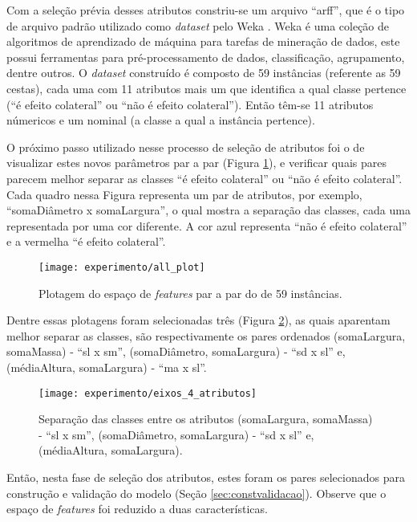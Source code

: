 Com a seleção prévia desses atributos constriu-se um arquivo ``arff'', que é o tipo de arquivo padrão utilizado como \textit{dataset} pelo Weka \cite{Hall:2009}. Weka é uma coleção de algoritmos de aprendizado de máquina para tarefas de mineração de dados, este possui ferramentas para pré-processamento de dados, classificação, agrupamento, dentre outros. O \textit{dataset} construído é composto de 59 instâncias (referente as 59 cestas), cada uma com 11 atributos mais um que identifica a qual classe pertence (``é efeito colateral'' ou ``não é efeito colateral''). Então têm-se 11 atributos númericos e um nominal (a classe a qual a instância pertence).

O próximo passo utilizado nesse processo de seleção de atributos foi o de visualizar estes novos parâmetros par a par (Figura \ref{fig:plotall1}), e verificar quais pares parecem melhor separar as classes ``é efeito colateral'' ou ``não é efeito colateral''. Cada quadro nessa Figura representa um par de atributos, por exemplo, ``somaDiâmetro x somaLargura'', o qual mostra a separação das classes, cada uma representada por uma cor diferente. A cor azul representa ``não é efeito colateral'' e a vermelha ``é efeito colateral''.

\begin{figure}[!htb] \centering 
  \centering
  \texttt{[image: experimento/all\_plot]} 
  \caption{Plotagem do espaço de \textit{features} par a par do  de 59 instâncias.} 
  \label{fig:plotall1}
\end{figure}
 
Dentre essas plotagens foram selecionadas três (Figura \ref{fig:eixos_4_atributos}), as quais aparentam melhor separar as classes, são respectivamente os pares ordenados (somaLargura, somaMassa) - ``sl x sm'', (somaDiâmetro, somaLargura) - ``sd x sl'' e, (médiaAltura, somaLargura) - ``ma x sl''.

\begin{figure}[!htb] \centering 
  \centering
  \texttt{[image: experimento/eixos\_4\_atributos]} 
  \caption{Separação das classes entre os atributos (somaLargura, somaMassa) - ``sl x sm'', (somaDiâmetro, somaLargura) - ``sd x sl'' e, (médiaAltura, somaLargura).} 
  \label{fig:eixos_4_atributos}
\end{figure}

Então, nesta fase de seleção dos atributos, estes foram os pares selecionados para construção e validação do modelo (Seção \ref{sec:constvalidacao}). Observe que o espaço de \textit{features} foi reduzido a duas características.

